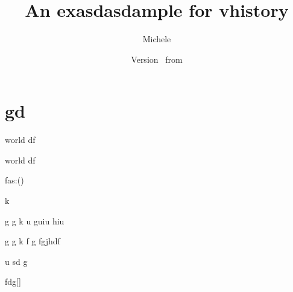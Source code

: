 \documentclass{article}
\author{Michele}
\newcommand{\docTitle}{An exasdasdample for vhistory}
\begin{document}
\section{gd}
	world df \gitRel
	
	world df \gitRel
	
	fas:\gitRoff(\gitCommitterDate)
	
	\begin{changelog}[author=Michele]
		\begin{version}[version=1.20]
			\added
			\item k
		\end{version}
		
		\begin{version}[version=\gitReln]
			\added
			\item  g g k u guiu  hiu
		\end{version}
		
		\begin{version}[version=\gitReln]
			\added
			\item  g g k f g fgjhdf
			\item u sd g
		\end{version} 
	\end{changelog}

fdg[\vhCurrentVersion]



	\title{\docTitle}
	\author{\vhListAllAuthors}
	\date{Version \vhCurrentVersion\ from \vhCurrentDate}

	\begin{versionhistory}
	\end{versionhistory}
\newpage
\end{document}
